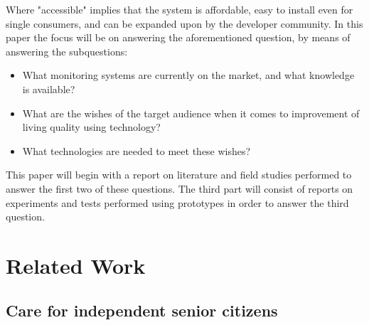 \documentclass{below-ext}
\begin{document}
Where "accessible" implies that the system is affordable, easy to install even for single consumers, and can be expanded upon by the developer community. In this paper the focus will be on answering the aforementioned question, by means of answering the subquestions:
\begin{itemize}
\item What monitoring systems are currently on the market, and what knowledge is available?
\item  What are the wishes of the target audience when it comes to improvement of living quality using technology?
\item What technologies are needed to meet these wishes?
\end{itemize}

This paper will begin with a report on literature and field studies performed to answer the first two of these questions. The third part will consist of reports on experiments and tests performed using prototypes in order to answer the third question. 


\section{Related Work}

\subsection{Care for independent senior citizens}
\end{document}
